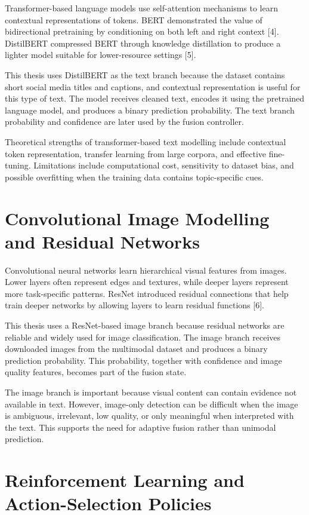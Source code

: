 Transformer-based language models use self-attention mechanisms to learn contextual representations of tokens. BERT demonstrated the value of bidirectional pretraining by conditioning on both left and right context [4]. DistilBERT compressed BERT through knowledge distillation to produce a lighter model suitable for lower-resource settings [5].


This thesis uses DistilBERT as the text branch because the dataset contains short social media titles and captions, and contextual representation is useful for this type of text. The model receives cleaned text, encodes it using the pretrained language model, and produces a binary prediction probability. The text branch probability and confidence are later used by the fusion controller.


Theoretical strengths of transformer-based text modelling include contextual token representation, transfer learning from large corpora, and effective fine-tuning. Limitations include computational cost, sensitivity to dataset bias, and possible overfitting when the training data contains topic-specific cues.


\section{Convolutional Image Modelling and Residual Networks}


Convolutional neural networks learn hierarchical visual features from images. Lower layers often represent edges and textures, while deeper layers represent more task-specific patterns. ResNet introduced residual connections that help train deeper networks by allowing layers to learn residual functions [6].


This thesis uses a ResNet-based image branch because residual networks are reliable and widely used for image classification. The image branch receives downloaded images from the multimodal dataset and produces a binary prediction probability. This probability, together with confidence and image quality features, becomes part of the fusion state.


The image branch is important because visual content can contain evidence not available in text. However, image-only detection can be difficult when the image is ambiguous, irrelevant, low quality, or only meaningful when interpreted with the text. This supports the need for adaptive fusion rather than unimodal prediction.


\section{Reinforcement Learning and Action-Selection Policies}


